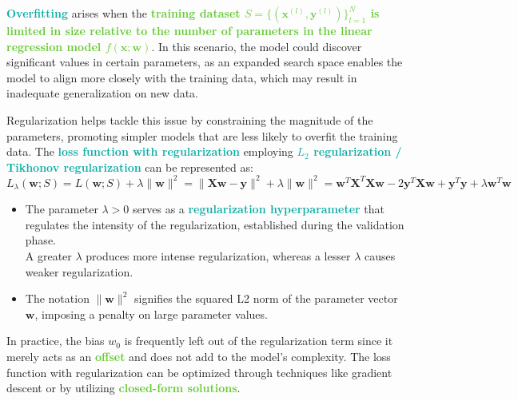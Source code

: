 \documentclass[twoside]{article}
\newcommand{\highlightbluetext}[1]{\textcolor[HTML]{09ACA6}{\textbf{#1}}}
\newcommand{\highlightgreentext}[1]{\textcolor[HTML]{62C92F}{\textbf{#1}}}
\numberwithin{equation}{section}
\begin{document}
	\newpage

	\highlightbluetext{Overfitting} arises when the \highlightgreentext{training dataset $S = \{(\mathbf{x}^{(l)}, \mathbf{y}^{(l)})\}_{l=1}^N$ is limited in size relative to the number of parameters in the linear regression model $f(\mathbf{x}; \mathbf{w})$}. In this scenario, the model could discover significant values in certain parameters, as an expanded search space enables the model to align more closely with the training data, which may result in inadequate generalization on new data.

	Regularization helps tackle this issue by constraining the magnitude of the parameters, promoting simpler models that are less likely to overfit the training data. The \highlightbluetext{loss function with regularization} employing \highlightbluetext{$L_2$ regularization / Tikhonov regularization} can be represented as:
	\begin{equation}
	\label{eq:RegularizedLossFunction}
	\boxed{L_{\lambda}(\mathbf{w}; S) = L(\mathbf{w}; S) + \lambda \|\mathbf{w}\|^2 = \|\mathbf{Xw} - \mathbf{y}\|^2 + \lambda \|\mathbf{w}\|^2 = \mathbf{w}^T \mathbf{X}^T \mathbf{X} \mathbf{w} - 2 \mathbf{y}^T \mathbf{X} \mathbf{w} + \mathbf{y}^T \mathbf{y} + \lambda \mathbf{w}^T \mathbf{w}}
	\end{equation}
	\begin{itemize}
		\item The parameter $\lambda > 0$ serves as a \highlightbluetext{regularization hyperparameter} that regulates the intensity of the regularization, established during the validation phase. \\
		A greater $\lambda$ produces more intense regularization, whereas a lesser $\lambda$ causes weaker regularization.
		\item The notation $\|\mathbf{w}\|^2$ signifies the squared L2 norm of the parameter vector $\mathbf{w}$, imposing a penalty on large parameter values.
	\end{itemize}
	In practice, the bias $w_0$ is frequently left out of the regularization term since it merely acts as an \highlightgreentext{offset} and does not add to the model's complexity. The loss function with regularization can be optimized through techniques like gradient descent or by utilizing \highlightgreentext{closed-form solutions}.
\end{document}
